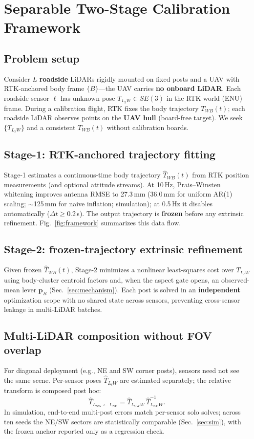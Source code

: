\section{Separable Two-Stage Calibration Framework}
\label{sec:framework}

\subsection{Problem setup}
Consider $L$ \textbf{roadside} LiDARs rigidly mounted on fixed posts and a UAV with
RTK-anchored body frame $\{B\}$---the UAV carries \textbf{no onboard LiDAR}.
Each roadside sensor $\ell$ has unknown pose $T_{L_\ell W}\in SE(3)$ in the RTK world
(ENU) frame.
During a calibration flight, RTK fixes the body trajectory $T_{WB}(t)$; each roadside
LiDAR observes points on the \textbf{UAV hull} (board-free target).
We seek $\{T_{L_\ell W}\}$ and a consistent $T_{WB}(t)$ without calibration boards.

\subsection{Stage-1: RTK-anchored trajectory fitting}
Stage-1 estimates a continuous-time body trajectory $\hat{T}_{WB}(t)$ from RTK
position measurements (and optional attitude streams).
At 10\,Hz, Prais--Winsten whitening improves antenna RMSE to 27.3\,mm (36.0\,mm for
uniform AR(1) scaling; $\sim$125\,mm for naive inflation; simulation); at 0.5\,Hz it
disables automatically ($\Delta t\geq 0.2$\,s).
The output trajectory is \textbf{frozen} before any extrinsic refinement.
Fig.~\ref{fig:framework} summarizes this data flow.

\subsection{Stage-2: frozen-trajectory extrinsic refinement}
Given frozen $\hat{T}_{WB}(t)$, Stage-2 minimizes a nonlinear least-squares cost over
$T_{L_\ell W}$ using body-cluster centroid factors and, when the aspect gate opens,
an observed-mean lever $\mathbf{p}_B$ (Sec.~\ref{sec:mechanism}).
Each post is solved in an \textbf{independent} optimization scope with no shared
state across sensors, preventing cross-sensor leakage in multi-LiDAR batches.

\subsection{Multi-LiDAR composition without FOV overlap}
For diagonal deployment (e.g., NE and SW corner posts), sensors need not see the
same scene.
Per-sensor poses $\hat{T}_{L_\ell W}$ are estimated separately; the relative transform
is composed post hoc:
\begin{equation}
  \hat{T}_{L_{\mathrm{SW}}\leftarrow L_{\mathrm{NE}}}
  = \hat{T}_{L_{\mathrm{SW}}W}\,\hat{T}_{L_{\mathrm{NE}}W}^{-1}.
  \label{eq:rel_compose}
\end{equation}
In simulation, end-to-end multi-post errors match per-sensor solo solves; across ten
seeds the NE/SW sectors are statistically comparable (Sec.~\ref{sec:sim}), with the
frozen anchor reported only as a regression check.

